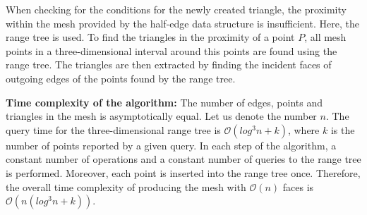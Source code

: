 When checking for the conditions for the newly created triangle, the 
proximity within the mesh provided by the half-edge data structure is
insufficient. Here, the range tree is used. To find the triangles in the
proximity of a point $P$, all mesh points in a three-dimensional interval
around this points are found using the range tree. The triangles are then 
extracted by finding the incident faces of outgoing edges of the points
found by the range tree.

\textbf{Time complexity of the algorithm:}
The number of edges, points and triangles in the mesh is asymptotically 
equal. Let us denote the number $n$. The query time for the three-dimensional 
range tree is $\mathcal{O}(log^3n+k)$, where $k$ is the number of points
reported by a given query. In each step of the algorithm, a constant number of
operations and a constant number of queries to the range tree is performed.
Moreover, each point is inserted into the range tree once.
Therefore, the overall time complexity of producing the mesh with $\mathcal{O}(n)$
faces is $\mathcal{O}(n (log^3n+k))$.